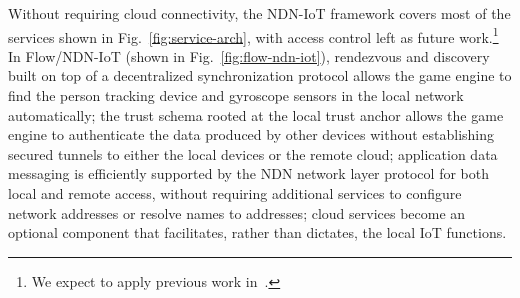 Without requiring cloud connectivity, the NDN-IoT framework covers most of the services shown in Fig.~\ref{fig:service-arch}, with access control left as future work.\footnote{We expect to apply previous work in~\cite{nac}.}
In Flow/NDN-IoT (shown in Fig.~\ref{fig:flow-ndn-iot}), rendezvous and discovery built on top of a decentralized synchronization protocol allows the game engine to find the person tracking device and gyroscope sensors in the local network automatically;
the trust schema rooted at the local trust anchor allows the game engine to authenticate the data produced by other devices without establishing secured tunnels to either the local devices or the remote cloud;
application data messaging is efficiently supported by the NDN network layer protocol for both local and remote access, without requiring additional services to configure network addresses or resolve names to addresses;
cloud services become an optional component that facilitates, rather than dictates, the local IoT functions.
